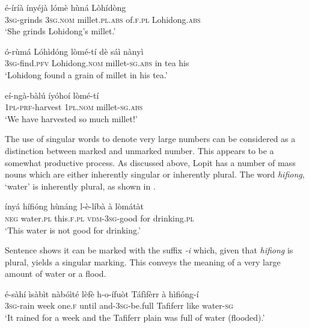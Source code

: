 \documentclass[output=paper]{langsci/langscibook}
\begin{document}
\ea\label{ex:moodie:8}
\gll \'{e}-\'{i}r\'{i}\`{a} \'{i}ny\'{e}j\`{a} l\'{o}m\`{e} h\`{u}n\'{a} L\`{o}h\'{i}d\`{o}ng \\
3\textsc{sg}-grinds 3\textsc{sg.nom} millet.\textsc{pl.abs} of.\textsc{f.pl} Lohidong.\textsc{abs} \\
\glt ‘She grinds Lohidong’s millet.’
\z

\ea\label{ex:moodie:9}
\gll \'{o}-r\`{u}m\'{a} L\'{o}h\`{i}d\'{o}ng l\`{o}m\'{e}-t\'{i} d\`{e} s\'{a}\`{i} n\`{a}ny\`{i}  \\
3\textsc{sg}-find.\textsc{pfv} Lohidong.\textsc{nom} millet-\textsc{sg.abs} in tea his \\
\glt ‘Lohidong found a grain of millet in his tea.’
\z

\ea\label{ex:moodie:10}
\gll e\'{i}-ng\`{a}-b\`{a}l\'{u} \'{i}y\'{o}ho\'{i} l\`{o}m\'{e}-t\'{i} \\
1\textsc{pl-prf}-harvest 1\textsc{pl.nom} millet-\textsc{sg.abs} \\
\glt ‘We have harvested so much millet!’
\z

The use of singular words to denote very large numbers can be considered as a distinction between marked and unmarked number. This appears to be a somewhat productive process. As discussed above, Lopit has a number of mass nouns which are either inherently singular or inherently plural. The word \textit{hifiong}, ‘water’ is inherently plural, as shown in .

\ea\label{ex:moodie:11}
\gll \'{i}ny\'{a} h\'{i}fi\'{o}ng h\`{u}n\'{a}ng l-\`{e}-l\'{i}b\`{a} \`{a} l\`{o}m\'{a}t\`{a}t \\
\textsc{neg} water.\textsc{pl} this.\textsc{f.pl} \textsc{vdm-3sg}-good for drinking.\textsc{pl} \\
\glt ‘This water is not good for drinking.’
\z

Sentence  shows it can be marked with the suffix \textit{-i} which, given that \textit{hifiong} is plural, yields a singular marking. This conveys the meaning of a very large amount of water or a flood.

\ea\label{ex:moodie:12}
\gll \'{e}-s\`{a}h\'{i} \`{i}s\`{a}b\`{i}t n\`{a}b\'{o}\`{i}t\'{e} l\`{e}f\`{e} h-o-\'{i}fu\`{o}t T\'{a}f\`{i}f\`{e}rr \`{a} h\`{i}fi\'{o}ng-\'{i} \\
\textsc{3sg}-rain week one.\textsc{f} until and-3\textsc{sg}-be.full Tafiferr like water-\textsc{sg} \\
\glt ‘It rained for a week and the Tafiferr plain was full of water (flooded).’ 
\z
\end{document}

